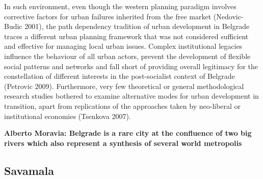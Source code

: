 \documentclass[11pt]{report}
\begin{document}
In such environment, even though the western planning paradigm involves corrective factors for urban failures inherited from the free market (Nedovic-Budic 2001), the path dependency tradition of urban development in Belgrade traces a different urban planning framework that was not considered sufficient and effective for managing local urban issues. Complex institutional legacies influence the behaviour of all urban actors, prevent the development of flexible social patterns and networks and fall short of providing overall legitimacy for the constellation of different interests in the post-socialist context of Belgrade (Petrovic 2009). Furthermore, very few theoretical or general methodological research studies bothered to examine alternative modes for urban development in transition, apart from replications of the approaches taken by neo-liberal or institutional economies (Tsenkova 2007).
   
\textbf{Alberto Moravia: Belgrade is a rare city at the confluence of two big rivers which also represent a synthesis of several world metropolis}

\subsection{Savamala}
\end{document}

